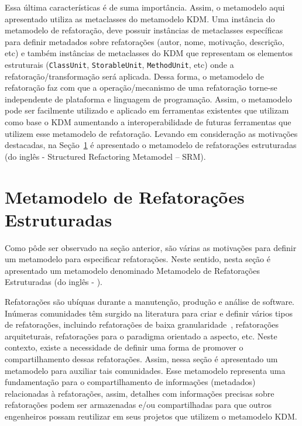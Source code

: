 Essa última características é de suma importância. Assim, o metamodelo aqui apresentado utiliza as metaclasses do metamodelo KDM. Uma instância do metamodelo de refatoração, deve possuir instâncias de metaclasses específicas para definir metadados sobre refatorações (autor, nome, motivação, descrição, etc) e também instâncias de metaclasses do KDM que representam os elementos estruturais (\texttt{ClassUnit}, \texttt{StorableUnit}, \texttt{MethodUnit}, etc) onde a refatoração/transformação será aplicada. Dessa forma, o metamodelo de refatoração faz com que a operação/mecanismo de uma refatoração torne-se independente de plataforma e linguagem de programação. Assim, o metamodelo pode ser facilmente utilizado e aplicado em ferramentas existentes que utilizam como base o KDM aumentando a interoperabilidade de futuras ferramentas que utilizem esse metamodelo de refatoração. Levando em consideração as motivações destacadas, na Seção~\ref{sec:meta_modelo_de_refatora_es_estruturadas_srm_do_ingl_s_structured refactoring meta-model_} é apresentado o metamodelo de refatorações estruturadas (do inglês - Structured Refactoring Metamodel – SRM).  



\section{Metamodelo de Refatorações Estruturadas} %
\label{sec:meta_modelo_de_refatora_es_estruturadas_srm_do_ingl_s_structured refactoring meta-model_}

Como pôde ser observado na seção anterior, são várias as motivações para definir um metamodelo para especificar refatorações. Neste sentido, nesta seção é apresentado um metamodelo denominado Metamodelo de Refatorações Estruturadas (do inglês - ).

Refatorações são ubíquas durante a manutenção, produção e análise de software. Inúmeras comunidades têm surgido na literatura para criar e definir vários tipos de refatorações, incluindo refatorações de baixa granularidade~\cite{Fowler1999, Demeyer1, Demeyer2}, refatorações arquiteturais, refatorações para o paradigma orientado a aspecto, etc. Neste contexto, existe a necessidade de definir uma forma de promover o compartilhamento dessas refatorações. Assim, nessa seção é apresentado um metamodelo para auxiliar tais comunidades. Esse metamodelo representa uma fundamentação para o compartilhamento de informações (metadados) relacionadas à refatorações, assim, detalhes com informações precisas sobre refatorações podem ser armazenadas e/ou compartilhadas para que outros engenheiros possam reutilizar em seus projetos que utilizem o metamodelo KDM.

